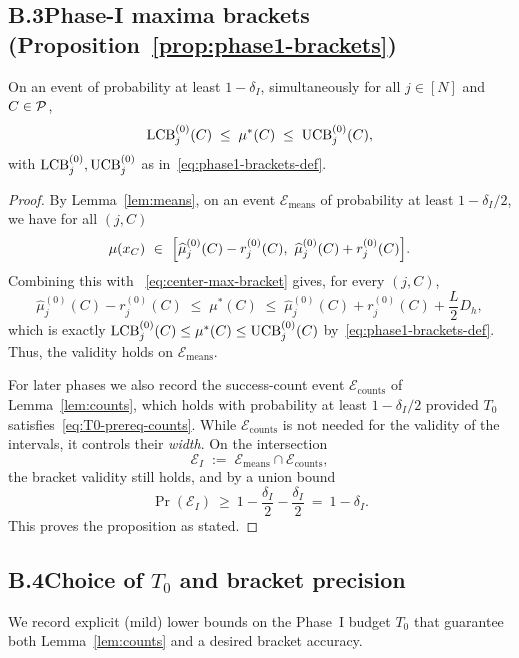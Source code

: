 \subsection*{B.3\quad Phase-I maxima brackets (Proposition~\ref{prop:phase1-brackets})}

\begin{proposition}
On an event of probability at least $1-\delta_{I}$, simultaneously for all $j\in[N]$ and $C\in \mathcal{P}$,
\[
\operatorname{LCB}^{(0)}_j(C) \;\le\; \mu^\ast(C) \;\le\; \operatorname{UCB}^{(0)}_j(C),
\]
with $\operatorname{LCB}^{(0)}_j,\operatorname{UCB}^{(0)}_j$ as in~\eqref{eq:phase1-brackets-def}.
\end{proposition}

\begin{proof}
By Lemma~\ref{lem:means}, on an event $\mathcal E_{\text{means}}$ of probability at least $1-\delta_I/2$, we have for all $(j,C)$
\[
\mu(x_C)\ \in\ \Bigl[\widehat\mu^{(0)}_j(C)-r^{(0)}_j(C),\ \widehat\mu^{(0)}_j(C)+r^{(0)}_j(C)\Bigr].
\]
Combining this with ~\eqref{eq:center-max-bracket} gives, for every $(j,C)$,
\[
\widehat{\mu}_j^{(0)}(C) - r^{(0)}_j(C) \;\le\; \mu^\ast(C) \;\le\; \widehat{\mu}_j^{(0)}(C) + r^{(0)}_j(C) + \frac{L}{2}D_h,
\]
which is exactly $\operatorname{LCB}^{(0)}_j(C)\le \mu^\ast(C)\le \operatorname{UCB}^{(0)}_j(C)$ by~\eqref{eq:phase1-brackets-def}. Thus, the validity holds on $\mathcal E_{\text{means}}$.

For later phases we also record the success-count event $\mathcal E_{\text{counts}}$ of Lemma~\ref{lem:counts}, which holds with probability at least $1-\delta_I/2$ provided $T_0$ satisfies~\eqref{eq:T0-prereq-counts}. While $\mathcal E_{\text{counts}}$ is not needed for the validity of the intervals, it controls their \emph{width}. On the intersection
\[
\mathcal E_I \;:=\; \mathcal E_{\text{means}} \cap \mathcal E_{\text{counts}},
\]
the bracket validity still holds, and by a union bound
\[
\Pr(\mathcal E_I)\ \ge\ 1 - \frac{\delta_I}{2} - \frac{\delta_I}{2} \ =\ 1-\delta_I.
\]
This proves the proposition as stated.
\end{proof}



\subsection*{B.4\quad Choice of $T_0$ and bracket precision}
\label{sec:choice-T0}

We record explicit (mild) lower bounds on the Phase~I budget $T_0$ that guarantee both Lemma~\ref{lem:counts} and a desired bracket accuracy.


